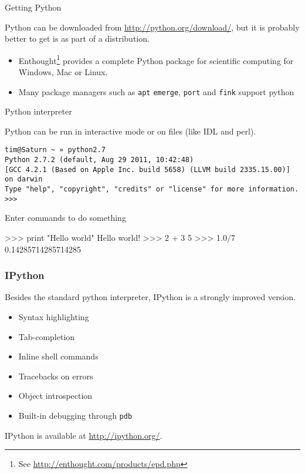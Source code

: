 \documentclass[xetex,10pt]{beamer}
\def\spacer{\vspace*{1em}}
\begin{document}
\begin{frame}[fragile]{Getting Python}
	
	Python can be downloaded from \url{http://python.org/download/}, but it is probably better to get is as part of a distribution.

	\spacer

	\begin{itemize}
		\item Enthought\footnote[frame]{See \url{http://enthought.com/products/epd.php}} provides a complete Python package for scientific computing for Windows, Mac or Linux.
		\item Many package managers such as \verb!apt! \verb!emerge!, \verb!port! and \verb!fink! support python
	\end{itemize}
	
\end{frame}

\begin{frame}[fragile]{Python interpreter}
	
	Python can be run in interactive mode or on files (like IDL and perl).
	
\begin{verbatim}
tim@Saturn ~ » python2.7
Python 2.7.2 (default, Aug 29 2011, 10:42:48) 
[GCC 4.2.1 (Based on Apple Inc. build 5658) (LLVM build 2335.15.00)] on darwin
Type "help", "copyright", "credits" or "license" for more information.
>>> 
\end{verbatim}

Enter commands to do something

\begin{python}
>>> print "Hello world"
Hello world!
>>> 2 + 3
5
>>> 1.0/7
0.14285714285714285
\end{python}

\end{frame}

\begin{frame}[fragile]
	\frametitle{IPython}
	
	Besides the standard python interpreter, IPython is a strongly improved version.

	\spacer

	\begin{itemize}
		\item Syntax highlighting
		\item Tab-completion
		\item Inline shell commands
		\item Tracebacks on errors
		\item Object introspection
		\item Built-in debugging through \verb!pdb!
	\end{itemize}
	
	\spacer
	IPython is available at \url{http://ipython.org/}.
	
\end{frame}
\end{document}
